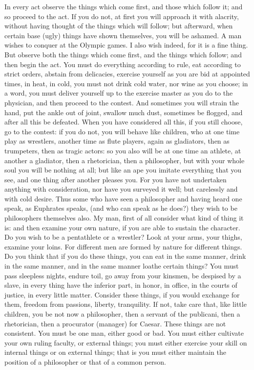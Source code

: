 In every act  observe the things which  come first, and those  which follow it;
and so proceed  to the act. If you  do not, at first you will  approach it with
alacrity,  without  having  thought  of  the  things  which  will  follow;  but
afterward, when certain  base (ugly) things have shown themselves,  you will be
ashamed. A man wishes to conquer at  the Olympic games. I also wish indeed, for
it is  a fine  thing. But  observe both the  things which  come first,  and the
things which follow;  and then begin the act. You  must do everything according
to  rule, eat  according to  strict orders,  abstain from  delicacies, exercise
yourself as  you are bid  at appointed  times, in heat,  in cold, you  must not
drink cold water, nor wine as you  choose; in a word, you must deliver yourself
up to the exercise  master as you do to the physician, and  then proceed to the
contest. And sometimes  you will strain the  hand, put the ankle  out of joint,
swallow much dust,  sometimes be flogged, and after all  this be defeated. When
you have considered all this, if you still choose, go to the contest: if you do
not, you will behave like children, who  at one time play as wrestlers, another
time as flute players, again as  gladiators, then as trumpeters, then as tragic
actors: so  you also will be  at one time  an athlete, at another  a gladiator,
then a rhetorician,  then a philosopher, but  with your whole soul  you will be
nothing at all;  but like an ape  you imitate everything that you  see, and one
thing after  another pleases  you. For  you have  not undertaken  anything with
consideration, nor  have you  surveyed it  well; but  carelessly and  with cold
desire. Thus some  who have seen a  philosopher and having heard  one speak, as
Euphrates speaks, (and who can speak as  he does?) they wish to be philosophers
themselves also. My  man, first of all  consider what kind of thing  it is: and
then examine your own nature, if you  are able to sustain the character. Do you
wish to be a pentathlete or a wrestler? Look at your arms, your thighs, examine
your loins. For different men are formed by nature for different things. Do you
think that if you do these things, you can eat in the same manner, drink in the
same  manner, and  in the  same  manner loathe  certain things?  You must  pass
sleepless nights,  endure toil,  go away  from your kinsmen,  be despised  by a
slave, in  every thing  have the  inferior part,  in honor,  in office,  in the
courts of justice, in every little  matter. Consider these things, if you would
exchange for  them, freedom from  passions, liberty, tranquility. If  not, take
care that, like little  children, you be not now a  philosopher, then a servant
of the publicani,  then a rhetorician, then a procurator  (manager) for Caesar.
These things are not  consistent. You must be one man, either  good or bad. You
must either  cultivate your own  ruling faculty,  or external things;  you must
either exercise  your skill on internal  things or on external  things; that is
you must  either maintain  the position of  a philosopher or  that of  a common
person.
